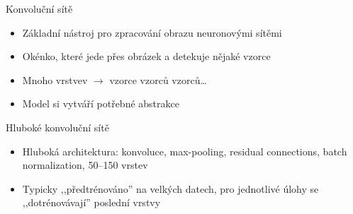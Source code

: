 \documentclass[aspectratio=169,dvipsnames]{beamer}
\begin{document}

\begin{frame}{Konvoluční sítě}

    \begin{minipage}{.45\textwidth}
        \begin{itemize}[<+->]

            \item Základní nástroj pro zpracování obrazu neuronovými sítěmi

            \item Okénko, které jede přes obrázek a detekuje nějaké vzorce

            \item Mnoho vrstvev $\rightarrow$ vzorce vzorců vzorců\ldots

            \item Model si vytváří potřebné abstrakce

        \end{itemize}
    \end{minipage}\begin{minipage}{.45\textwidth}
        \centering
        \scalebox{0.7}{}
    \end{minipage}

\end{frame}


\begin{frame}{Hluboké konvoluční sítě}

    \begin{center}
        \scalebox{0.4}{}
    \end{center}

    \begin{itemize}[<+->]

        \item Hluboká architektura: konvoluce, max-pooling, residual connections,
            batch normalization, 50--150 vrstev

        \item Typicky ,,předtrénováno'' na velkých datech, pro jednotlivé úlohy
            se ,,dotrénovávají'' poslední vrstvy

    \end{itemize}

\end{frame}
\end{document}
